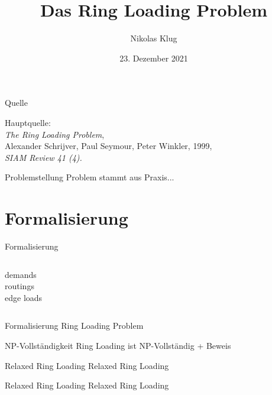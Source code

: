 \documentclass[8pt]{beamer}
\title[]{Das Ring Loading Problem}
\author[Nikolas Klug]{Nikolas Klug}
\institute[Universität Augsburg]{Universität Augsburg}
\date{23. Dezember 2021}
\begin{document}
	{
	\begin{frame}
		\titlepage
	\end{frame}
	}
	\addtocounter{framenumber}{-1}

	\begin{frame}{Quelle}

		Hauptquelle:\\
		\emph{The Ring Loading Problem},\\
		 Alexander Schrijver, Paul Seymour, Peter Winkler, 1999,\\
		 \emph{SIAM Review 41 (4).}\\
	\end{frame}
	
	\begin{frame}{Problemstellung}
		Problem stammt aus Praxis...
	\end{frame}

	\section{Formalisierung}
	
	\begin{frame}{Formalisierung}
		\begin{columns}
			\column{0.6\linewidth}
			demands\\
			routings\\
			edge loads\\
			\column{0.4\linewidth}
			
		\end{columns} 
	\end{frame}

	\begin{frame}{Formalisierung}
		Ring Loading Problem
	\end{frame}

	\begin{frame}{NP-Vollständigkeit}
		Ring Loading ist NP-Vollständig + Beweis
	\end{frame}

	\begin{frame}{Relaxed Ring Loading}
		Relaxed Ring Loading
	\end{frame}
	
	\begin{frame}{Relaxed Ring Loading}
		Relaxed Ring Loading
	\end{frame}
	
\end{document}
